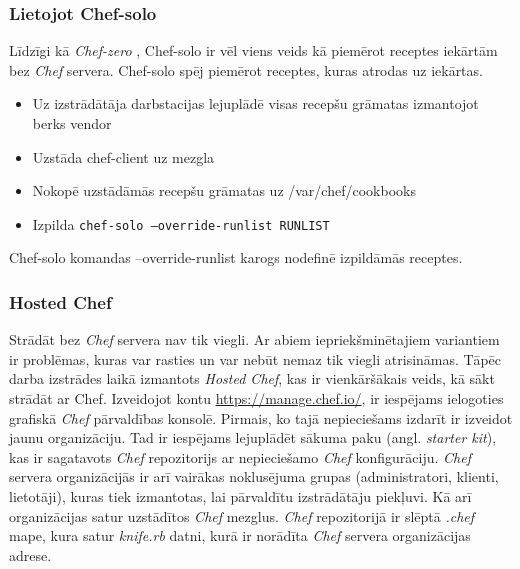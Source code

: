 \subsubsection{Lietojot Chef-solo}
Līdzīgi kā \textit{Chef-zero} , Chef-solo ir vēl viens veids kā piemērot receptes iekārtām bez \textit{Chef} servera. Chef-solo spēj piemērot receptes, kuras atrodas uz iekārtas.
\begin{itemize}
	\item Uz izstrādātāja darbstacijas lejuplādē visas recepšu grāmatas izmantojot berks vendor
	\item Uzstāda chef-client uz mezgla
	\item Nokopē uzstādāmās recepšu grāmatas uz /var/chef/cookbooks
	\item Izpilda \texttt{chef-solo --override-runlist RUNLIST}
\end{itemize}
Chef-solo komandas --override-runlist karogs nodefinē izpildāmās receptes.

\subsubsection{Hosted Chef}
Strādāt bez \textit{Chef} servera nav tik viegli. Ar abiem iepriekšminētajiem variantiem ir problēmas, kuras var rasties un var nebūt nemaz tik viegli atrisināmas.
Tāpēc darba izstrādes laikā izmantots \textit{Hosted Chef}, kas ir vienkāršākais veids, kā sākt strādāt ar Chef.
Izveidojot kontu \url{https://manage.chef.io/}, ir iespējams ielogoties grafiskā \textit{Chef} pārvaldības konsolē.
Pirmais, ko tajā nepieciešams izdarīt ir izveidot jaunu organizāciju. Tad ir iespējams lejuplādēt sākuma paku (angl. \textit{starter kit}), kas ir sagatavots \textit{Chef} repozitorijs ar nepieciešamo \textit{Chef} konfigurāciju. \textit{Chef} servera organizācijās ir arī vairākas noklusējuma grupas (administratori, klienti, lietotāji), kuras tiek izmantotas, lai pārvaldītu izstrādātāju piekļuvi. Kā arī organizācijas satur uzstādītos \textit{Chef} mezglus. \textit{Chef} repozitorijā ir slēptā \textit{.chef} mape, kura satur \textit{knife.rb} datni, kurā ir norādīta \textit{Chef} servera organizācijas adrese.

